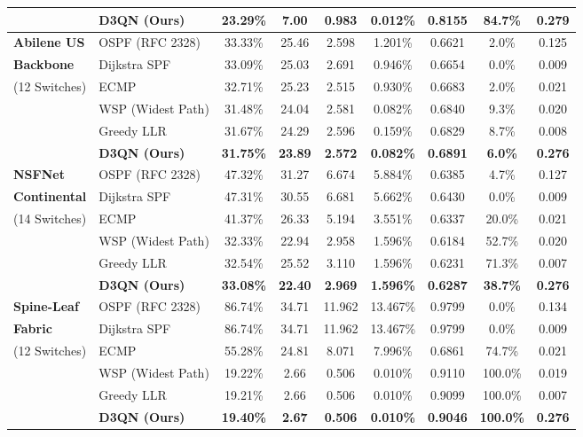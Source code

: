 \documentclass[12pt,a4paper,oneside]{report}
\begin{document}
\begin{table}[htbp]
\begin{tabularx}{\textwidth}{l l c c c c c c c}
& \textbf{D3QN (Ours)} & \textbf{23.29\%} & \textbf{7.00} & \textbf{0.983} & \textbf{0.012\%} & \textbf{0.8155} & \textbf{84.7\%} & \textbf{0.279} \\
\midrule
\textbf{Abilene US} & OSPF (RFC 2328) & 33.33\% & 25.46 & 2.598 & 1.201\% & 0.6621 & 2.0\% & 0.125 \\
\textbf{Backbone} & Dijkstra SPF & 33.09\% & 25.03 & 2.691 & 0.946\% & 0.6654 & 0.0\% & 0.009 \\
(12 Switches) & ECMP & 32.71\% & 25.23 & 2.515 & 0.930\% & 0.6683 & 2.0\% & 0.021 \\
& WSP (Widest Path) & 31.48\% & 24.04 & 2.581 & 0.082\% & 0.6840 & 9.3\% & 0.020 \\
& Greedy LLR & 31.67\% & 24.29 & 2.596 & 0.159\% & 0.6829 & 8.7\% & 0.008 \\
& \textbf{D3QN (Ours)} & \textbf{31.75\%} & \textbf{23.89} & \textbf{2.572} & \textbf{0.082\%} & \textbf{0.6891} & \textbf{6.0\%} & \textbf{0.276} \\
\midrule
\textbf{NSFNet} & OSPF (RFC 2328) & 47.32\% & 31.27 & 6.674 & 5.884\% & 0.6385 & 4.7\% & 0.127 \\
\textbf{Continental} & Dijkstra SPF & 47.31\% & 30.55 & 6.681 & 5.662\% & 0.6430 & 0.0\% & 0.009 \\
(14 Switches) & ECMP & 41.37\% & 26.33 & 5.194 & 3.551\% & 0.6337 & 20.0\% & 0.021 \\
& WSP (Widest Path) & 32.33\% & 22.94 & 2.958 & 1.596\% & 0.6184 & 52.7\% & 0.020 \\
& Greedy LLR & 32.54\% & 25.52 & 3.110 & 1.596\% & 0.6231 & 71.3\% & 0.007 \\
& \textbf{D3QN (Ours)} & \textbf{33.08\%} & \textbf{22.40} & \textbf{2.969} & \textbf{1.596\%} & \textbf{0.6287} & \textbf{38.7\%} & \textbf{0.276} \\
\midrule
\textbf{Spine-Leaf} & OSPF (RFC 2328) & 86.74\% & 34.71 & 11.962 & 13.467\% & 0.9799 & 0.0\% & 0.134 \\
\textbf{Fabric} & Dijkstra SPF & 86.74\% & 34.71 & 11.962 & 13.467\% & 0.9799 & 0.0\% & 0.009 \\
(12 Switches) & ECMP & 55.28\% & 24.81 & 8.071 & 7.996\% & 0.6861 & 74.7\% & 0.021 \\
& WSP (Widest Path) & 19.22\% & 2.66 & 0.506 & 0.010\% & 0.9110 & 100.0\% & 0.019 \\
& Greedy LLR & 19.21\% & 2.66 & 0.506 & 0.010\% & 0.9099 & 100.0\% & 0.007 \\
& \textbf{D3QN (Ours)} & \textbf{19.40\%} & \textbf{2.67} & \textbf{0.506} & \textbf{0.010\%} & \textbf{0.9046} & \textbf{100.0\%} & \textbf{0.276} \\
\bottomrule
\end{tabularx}
\end{table}
\end{document}
